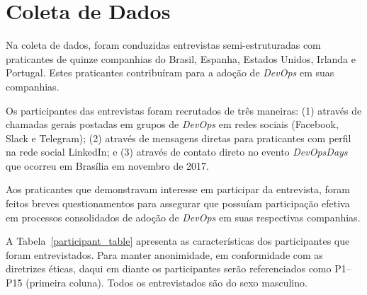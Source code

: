 \section{Coleta de Dados}

Na coleta de dados, foram conduzidas entrevistas semi-estruturadas com praticantes
de quinze companhias do Brasil, Espanha, Estados Unidos, Irlanda e Portugal.
Estes praticantes contribuíram para a adoção de \textit{DevOps} em suas
companhias.

Os participantes das entrevistas foram recrutados de três maneiras: (1) através
de chamadas gerais postadas em grupos de {\it DevOps} em redes sociais
(Facebook, Slack e Telegram); (2) através de mensagens diretas para
praticantes com perfil na rede social LinkedIn; e (3) através de contato direto
no evento \emph{DevOpsDays} que ocorreu em Brasília em novembro de 2017.

Aos praticantes que demonstravam interesse em participar da entrevista, foram
feitos breves questionamentos para assegurar que possuíam participação efetiva
em processos consolidados de adoção de {\it DevOps} em suas respectivas
companhias.

A Tabela~\ref{participant_table} apresenta as características dos participantes
que foram entrevistados. Para manter anonimidade, em conformidade com as
diretrizes éticas, daqui em diante os participantes serão referenciados como
P1--P15 (primeira coluna). Todos os entrevistados são do sexo masculino.

